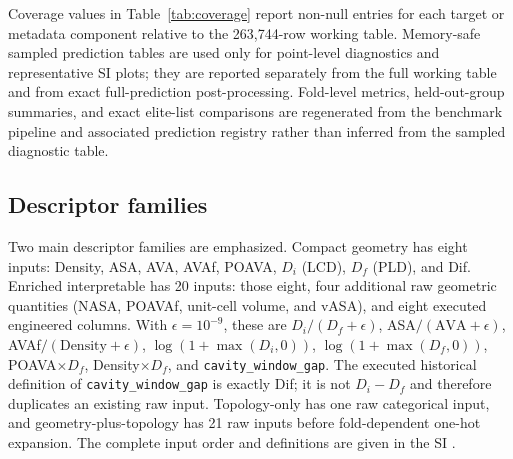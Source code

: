 \documentclass[11pt,a4paper]{article}
\begin{document}
Coverage values in Table~\ref{tab:coverage} report non-null entries for each target or metadata component relative to the 263,744-row working table. Memory-safe sampled prediction tables are used only for point-level diagnostics and representative SI plots; they are reported separately from the full working table and from exact full-prediction post-processing. Fold-level metrics, held-out-group summaries, and exact elite-list comparisons are regenerated from the benchmark pipeline and associated prediction registry rather than inferred from the sampled diagnostic table.


\subsection*{Descriptor families}
Two main descriptor families are emphasized. Compact geometry has eight inputs: Density, ASA, AVA, AVAf, POAVA, $D_i$ (LCD), $D_f$ (PLD), and Dif. Enriched interpretable has 20 inputs: those eight, four additional raw geometric quantities (NASA, POAVAf, unit-cell volume, and vASA), and eight executed engineered columns. With $\epsilon=10^{-9}$, these are $D_i/(D_f+\epsilon)$, ASA$/(\mathrm{AVA}+\epsilon)$, AVAf$/(\mathrm{Density}+\epsilon)$, $\log(1+\max(D_i,0))$, $\log(1+\max(D_f,0))$, POAVA$\times D_f$, Density$\times D_f$, and \texttt{cavity\_window\_gap}. The executed historical definition of \texttt{cavity\_window\_gap} is exactly Dif; it is not $D_i-D_f$ and therefore duplicates an existing raw input. Topology-only has one raw categorical input, and geometry-plus-topology has 21 raw inputs before fold-dependent one-hot expansion. The complete input order and definitions are given in the SI \citep{Fernandez2014MLCO2MOFs,Bucior2019EnergyDescriptors}.
\end{document}
